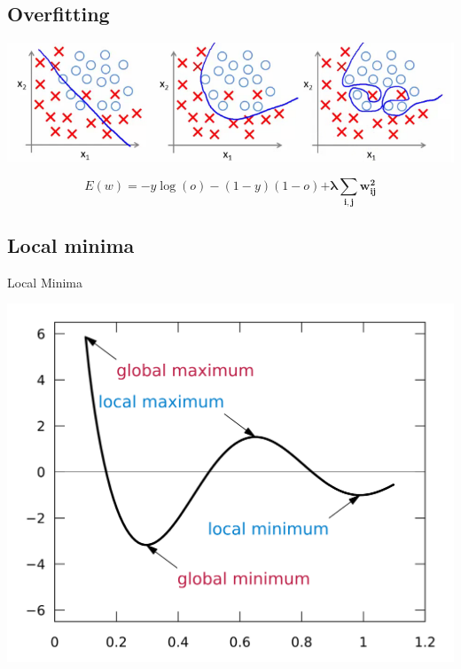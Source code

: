 \subsection{Overfitting}

\begin{frame}[c]{}
  \begin{center}
    \includegraphics[scale=0.6]{./pictures/overfitting.png}
  \end{center}
\end{frame}

\begin{frame}
  \begin{equation*}
    E(w) = -y \log(o) - (1 - y)(1 - o) \mathbf{+ \lambda \displaystyle\sum_{i, j}{w_{ij}^2}}
  \end{equation*}
\end{frame}

\subsection{Local minima}

\begin{frame}[c]{Local Minima}
  \begin{center}
    \includegraphics[scale=0.095]{./pictures/local_minima.png}
  \end{center}
\end{frame}

